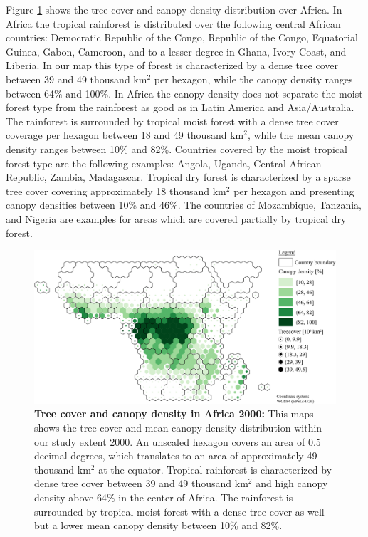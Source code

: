 			Figure \ref{fig:africa_tree_cover} shows the tree cover and canopy density distribution over Africa. In Africa the tropical rainforest is distributed over the following central African countries: Democratic Republic of the Congo, Republic of the Congo, Equatorial Guinea, Gabon, Cameroon, and to a lesser degree in Ghana, Ivory Coast, and Liberia. In our map this type of forest is characterized by a dense tree cover between 39 and 49 thousand km$^2$ per hexagon, while the canopy density ranges between 64\% and 100\%. In Africa the canopy density does not separate the moist forest type from the rainforest as good as in Latin America and Asia/Australia. The rainforest is surrounded by tropical moist forest with a dense tree cover coverage per hexagon between 18 and 49 thousand km$^2$, while the mean canopy density ranges between 10\% and 82\%. Countries covered by the moist tropical forest type are the following examples: Angola, Uganda, Central African Republic, Zambia, Madagascar. Tropical dry forest is characterized by a sparse tree cover covering approximately 18 thousand km$^2$ per hexagon and presenting canopy densities between 10\% and 46\%. The countries of Mozambique, Tanzania, and Nigeria are examples for areas which are covered partially by tropical dry forest.
			\begin{figure}[ht]
				\centering
				\includegraphics[scale=.91]{img/africa_treecover_frameless}
				\caption[Tree cover and canopy density in Africa 2000]{\textbf{Tree cover and canopy density in Africa 2000:} This maps shows the tree cover and mean canopy density distribution within our study extent 2000. An unscaled hexagon covers an area of 0.5 decimal degrees, which translates to an area of approximately 49 thousand km$^2$ at the equator. Tropical rainforest is characterized by dense tree cover between 39 and 49 thousand km$^2$ and high canopy density above 64\% in the center of Africa. The rainforest is surrounded by tropical moist forest with a dense tree cover as well but a lower mean canopy density between 10\% and 82\%.}
				\label{fig:africa_tree_cover}
			\end{figure}

